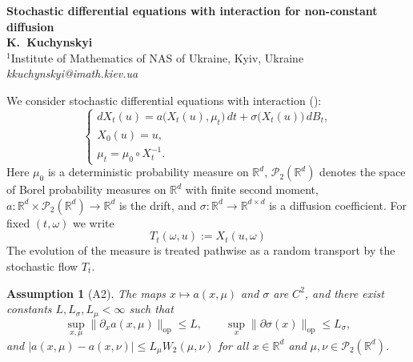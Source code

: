 \documentclass[12pt]{article}
\newtheorem{assumption}{Assumption}
\begin{document}

\begin{center}
    \textbf{\Large \sc Stochastic differential equations with interaction for non-constant diffusion}\\[1ex]
    \textbf{K.~Kuchynskyi}\\[0.4ex]
    ${}^1$Institute of Mathematics of NAS of Ukraine, Kyiv, Ukraine\\[0.4ex]
    \textit{kkuchynskyi@imath.kiev.ua}
\end{center}

We consider stochastic differential equations with interaction
(\cite{Dorogovtsev2004}):
\begin{equation}
    \begin{cases}
        dX_t(u)=a\bigl(X_t(u),\mu_t\bigr)\,dt+
        \sigma\bigl(X_t(u)\bigr)\,dB_t, \\
        X_0(u)=u,                       \\
        \mu_t=\mu_0\circ X_t^{-1}.
    \end{cases}
    \label{eq:main-summary}
\end{equation}
Here $\mu_0$ is a deterministic probability measure on $\mathbb R^d$,
$\mathcal P_2(\mathbb R^d)$ denotes the space of Borel probability measures on
$\mathbb R^d$ with finite second moment,
$a:\mathbb R^d\times\mathcal P_2(\mathbb R^d)\to\mathbb R^d$ is the drift,
and $\sigma:\mathbb R^d\to\mathbb R^{d\times d}$ is a diffusion
coefficient.  For fixed $(t,\omega)$ we write
\begin{equation}
    T_t(\omega,u):=X_t(u,\omega)
\end{equation}
The evolution of the measure is treated pathwise as a random transport by
the stochastic flow $T_t$.



\begin{assumption}[A2]\label{ass:general_lipschitz}
    The maps $x\mapsto a(x,\mu)$ and $\sigma$ are $C^2$, and there exist
    constants $L,L_\sigma,L_\mu<\infty$ such that
    \begin{equation}
        \sup_{x,\mu}\|\partial_xa(x,\mu)\|_{\mathrm{op}}\le L,\qquad
        \sup_x\|\partial\sigma(x)\|_{\mathrm{op}}\le L_\sigma,
    \end{equation}
    and $|a(x,\mu)-a(x,\nu)|\le L_\mu W_2(\mu,\nu)$ for all
    $x\in\mathbb R^d$ and $\mu,\nu\in\mathcal P_2(\mathbb R^d)$.
\end{assumption}
\end{document}
